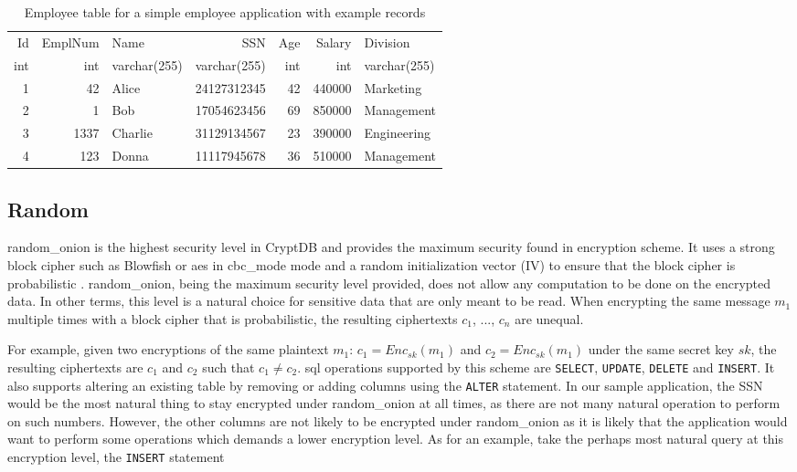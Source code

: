 \begin{table}[H]
\centering
\begin{tabular}{| r | r | l | r | r | r | l |}
\hline
  Id & EmplNum & Name & SSN & Age & Salary & Division \\
  int & int & varchar(255) & varchar(255) & int & int & varchar(255) \\
 \hline \hline
 1 & 42 & Alice & 24127312345 & 42 & 440000 & Marketing \\
 2 & 1 & Bob & 17054623456 & 69 & 850000 & Management \\
 3 & 1337 & Charlie & 31129134567 & 23 & 390000 & Engineering \\
 4 & 123 & Donna & 11117945678 & 36 & 510000 & Management \\
 \hline

\end{tabular}
\caption{Employee table for a simple employee application with example records}
\label{demoapp_table}
\end{table}



\subsection{Random}

\Gls{random_onion} is the highest security level in CryptDB and provides the maximum security found in encryption scheme. It uses a strong block cipher such as Blowfish or \Gls{aes} in \Gls{cbc_mode} mode and a random initialization vector (IV) to ensure that the block cipher is probabilistic \citep{CryptDB_Main_Paper}. \Gls{random_onion}, being the maximum security level provided, does not allow any computation to be done on the encrypted data. In other terms, this level is a natural choice for sensitive data that are only meant to be read. When encrypting the same message $m_1$ multiple times with a block cipher that is probabilistic, the resulting ciphertexts $c_1$, $...$, $c_n$ are unequal. 

For example, given two encryptions of the same plaintext $m_1$: $c_1 = Enc_{sk}(m_1)$ and $c_2 = Enc_{sk}(m_1)$ under the same secret key $sk$, the resulting ciphertexts are $c_1$ and $c_2$ such that $c_1 \neq c_2$. \gls{sql} operations supported by this scheme are \verb!SELECT!, \verb!UPDATE!, \verb!DELETE! and \verb!INSERT!. It also supports altering an existing table by removing or adding columns using the \verb!ALTER! statement. In our sample application, the SSN would be the most natural thing to stay encrypted under \gls{random_onion} at all times, as there are not many natural operation to perform on such numbers. However, the other columns are not likely to be encrypted under \gls{random_onion} as it is likely that the application would want to perform some operations which demands a lower encryption level. As for an example, take the perhaps most natural query at this encryption level, the \verb!INSERT! statement

